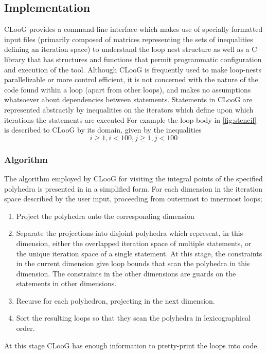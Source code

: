 \documentclass[a4paper,12pt,twoside]{report}
\begin{document}
\subsection{Implementation}
CLooG provides a command-line interface which makes use of specially formatted input files (primarily composed of matrices representing
the sets of inequalities defining an iteration space) to understand the loop nest structure as well as a C library that has structures and
functions that permit programmatic configuration and execution of the tool.
Although CLooG is frequently used to make loop-nests parallelizable or more control efficient, it is not concerned with the nature of the
code found within a loop (apart from other loops), and makes no assumptions whatsoever about dependencies between statements.
Statements in CLooG are represented abstractly by inequalities on the iterators which define upon which iterations the statements are executed 
For example the loop body in \ref{fig:stencil} is described to CLooG by its domain, given by the inequalities
\[i \ge 1 , i < 100 , j \ge 1, j < 100 \]

\subsubsection{Algorithm}
The algorithm employed by CLooG for visiting the integral points of the specified polyhedra is presented in in a simplified form.
For each dimension in the iteration space described by the user input, proceeding from outermost to innermost loops;
\begin{enumerate}
    \item Project the polyhedra onto the corresponding dimension 
    \item Separate the projections into disjoint polyhedra which represent, in this dimension, either the overlapped iteration
        space of multiple statements, or the unique iteration space of a single statement. At this stage, the constraints in the current
        dimension give loop bounds that scan the polyhedra in this dimension. The constraints in the other dimensions are guards on 
        the statements in other dimensions.
    \item Recurse for each polyhedron, projecting in the next dimension.
    \item Sort the resulting loops so that they scan the polyhedra in lexicographical order.
\end{enumerate}
At this stage CLooG has enough information to pretty-print the loops into code.
\end{document}
